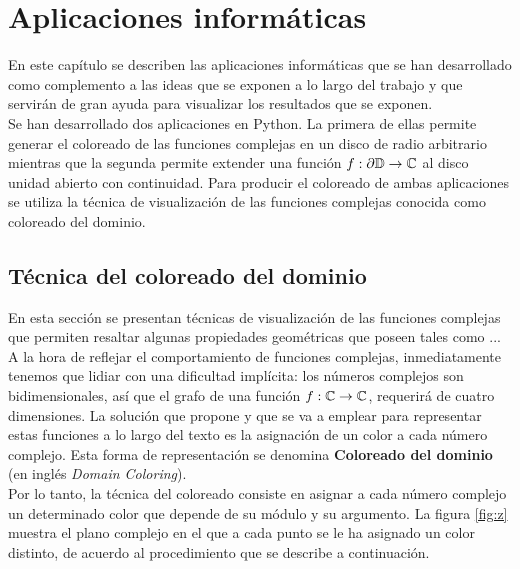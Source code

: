 \chapter{Aplicaciones informáticas}


En este capítulo se describen las aplicaciones informáticas que se han desarrollado como complemento a las ideas que se exponen a lo largo del trabajo y que servirán de gran ayuda para visualizar los resultados que se exponen. \\

Se han desarrollado dos aplicaciones en Python. La primera de ellas permite generar el coloreado de las funciones complejas en un disco de radio arbitrario mientras que la segunda permite extender una función $f: \partial \mathbb{D} \to \mathbb{C}$ al disco unidad abierto con continuidad. Para producir el coloreado de ambas aplicaciones se utiliza la técnica de visualización de las funciones complejas conocida como coloreado del dominio. \\


\section{Técnica del coloreado del dominio}

En esta sección se presentan técnicas de visualización de las funciones complejas que permiten resaltar algunas propiedades geométricas que poseen tales como  ... \\

A la hora de reflejar el comportamiento de funciones complejas, inmediatamente tenemos que lidiar con una dificultad implícita: los números complejos son bidimensionales, así que el grafo de una función $f : \mathbb{C} \to \mathbb{C}$, requerirá de cuatro dimensiones. La solución que propone \cite{Velleman2015} y que se va a emplear para representar estas funciones a lo largo del texto es la asignación de un color a cada número complejo. Esta forma de representación se denomina \textbf{Coloreado del dominio} (en inglés \textit{Domain Coloring}). \\

Por lo tanto, la técnica del coloreado consiste en asignar a cada número complejo un determinado color que depende de su módulo y su argumento. La figura \ref{fig:z} muestra el plano complejo en el que a cada punto se le ha asignado un color distinto, de acuerdo al procedimiento que se describe a continuación. \\

